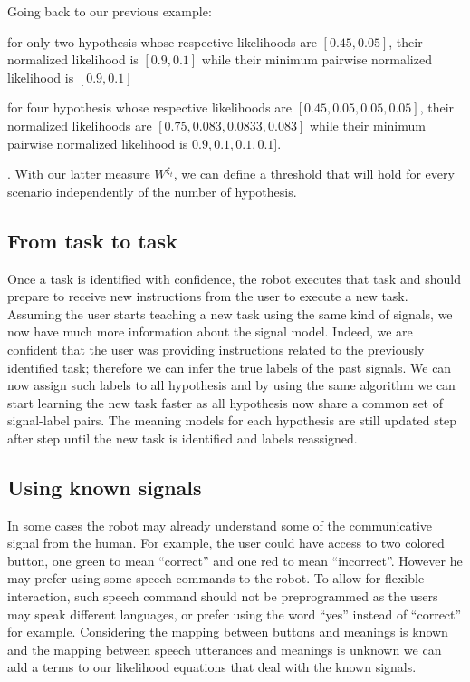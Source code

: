 Going back to our previous example: \begin{inparaenum}[a)] \item for only two hypothesis whose respective likelihoods are $[0.45, 0.05]$, their normalized likelihood is $[0.9,0.1]$ while their minimum pairwise normalized likelihood is $[0.9, 0.1]$ \item for four hypothesis whose respective likelihoods are $[0.45, 0.05, 0.05, 0.05]$, their normalized likelihoods are $[0.75, 0.083, 0.0833, 0.083]$ while their minimum pairwise normalized likelihood is $0.9, 0.1, 0.1, 0.1]$. \end{inparaenum}. With our latter measure $W^{\xi_t}$, we can define a threshold that will hold for every scenario independently of the number of hypothesis. 

\subsection{From task to task}
\label{chapter:lfui:tasttotask}

Once a task is identified with confidence, the robot executes that task and should prepare to receive new instructions from the user to execute a new task. Assuming the user starts teaching a new task using the same kind of signals, we now have much more information about the signal model. Indeed, we are confident that the user was providing instructions related to the previously identified task; therefore we can infer the true labels of the past signals. We can now  assign such labels to all hypothesis and by using the same algorithm we can start learning the new task faster as all hypothesis now share a common set of signal-label pairs. The meaning models for each hypothesis are still updated step after step until the new task is identified and labels reassigned.


\subsection{Using known signals}

In some cases the robot may already understand some of the communicative signal from the human. For example, the user could have access to two colored button, one green to mean ``correct'' and one red to mean ``incorrect''. However he may prefer using some speech commands to the robot. To allow for flexible interaction, such speech command should not be preprogrammed as the users may speak different languages, or prefer using the word ``yes'' instead of ``correct'' for example. Considering the mapping between buttons and meanings is known and the mapping between speech utterances and meanings is unknown we can add a terms to our likelihood equations that deal with the known signals. 

